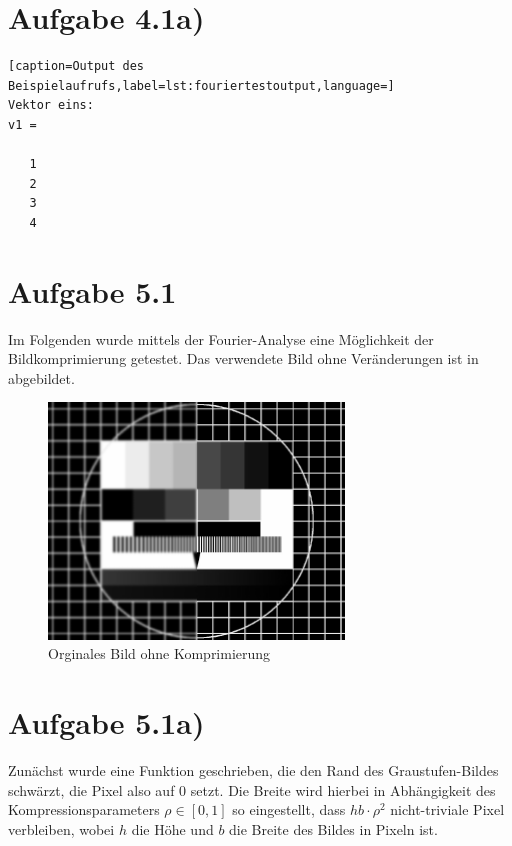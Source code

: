 \section*{Aufgabe 4.1a)}
\begin{lstlisting}[caption=Output des Beispielaufrufs,label=lst:fouriertestoutput,language=]
Vektor eins: 
v1 =

   1
   2
   3
   4
\end{lstlisting}



\section*{Aufgabe 5.1}
Im Folgenden wurde mittels der Fourier-Analyse eine Möglichkeit der Bildkomprimierung
getestet. Das verwendete Bild ohne Veränderungen ist in  abgebildet.

\begin{figure}[htb]
\centering
  \includegraphics[width=0.7\textwidth,keepaspectratio]{../tmp/testbild}
  \caption{Orginales Bild ohne Komprimierung}
  \label{fig:orig}
\end{figure}

\section*{Aufgabe 5.1a)}

Zunächst wurde eine Funktion  geschrieben, die den Rand des Graustufen-Bildes
schwärzt, die Pixel also auf 0 setzt. Die Breite wird hierbei in Abhängigkeit
des Kompressionsparameters $ρ \in [0,1]$ so eingestellt, dass $hb\cdot ρ^2$
nicht-triviale Pixel verbleiben, wobei $h$ die Höhe und $b$ die Breite des
Bildes in Pixeln ist.



